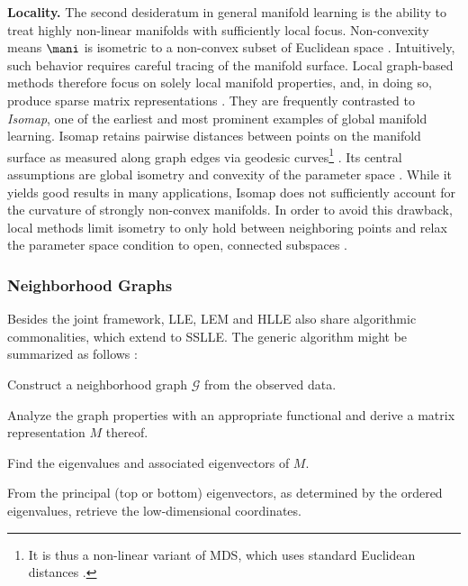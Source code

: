 \textbf{Locality.} The second desideratum in general manifold learning is the 
ability to treat highly non-linear manifolds with sufficiently local focus.
Non-convexity means $\mani$ is isometric to a non-convex subset of Euclidean 
space \citep{donohogrimes2003}. 
Intuitively, such behavior requires careful tracing of the manifold surface.
Local graph-based methods therefore focus on solely local manifold properties, 
and, in doing so, produce sparse matrix representations \citep{cayton2005}.
They are frequently contrasted to \textit{Isomap}, one of the 
earliest and most prominent examples of global manifold learning.
Isomap retains pairwise distances between points on the manifold surface as 
measured along graph edges via geodesic curves\footnote{
It is thus a non-linear variant of MDS, which uses standard Euclidean distances 
\citep{tenenbaumdesilvalangford2000}.
} \citep{tenenbaumdesilvalangford2000}.
Its central assumptions are global isometry and convexity of the parameter 
space \citep{tenenbaumdesilvalangford2000}.
While it yields good results in many applications, Isomap does not sufficiently 
account for the curvature of strongly non-convex manifolds.
In order to avoid this drawback, local methods limit isometry to only hold 
between neighboring points and relax the parameter space 
condition to open, connected subspaces \citep{donohogrimes2003}.


\subsubsection{Neighborhood Graphs}
\label{algo-common}

Besides the joint framework, LLE, LEM and HLLE also share algorithmic 
commonalities, which extend to SSLLE.
The generic algorithm might be summarized as follows \citep{bengioetal2003}:

\begin{tight_enumerate}
  \item Construct a neighborhood graph $\mathcal{G}$ from the observed data.
  \item Analyze the graph properties with an appropriate functional and derive 
  a matrix representation $M$ thereof.
  \item Find the eigenvalues and associated eigenvectors of $M$.
  \item From the principal (top or bottom) eigenvectors, as determined by the 
  ordered eigenvalues, retrieve the low-dimensional coordinates.
\end{tight_enumerate}

